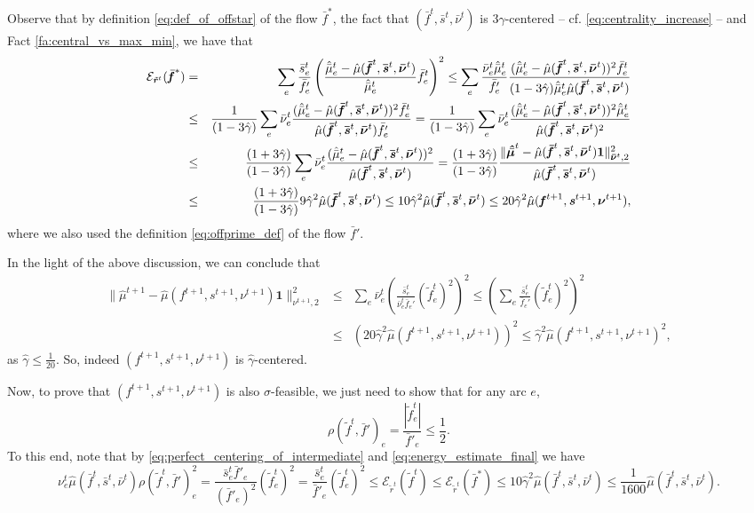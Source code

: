 \documentclass[11pt, letterpaper]{article}
\newcommand{\onev}{\mathbf{1}}
\newcommand{\norm}[2]{\|#1\|_{#2}}
\newcommand{\energy}[2]{\mathcal{E}_{#1}(#2)}
\newcommand{\tf}{\tilde{f}}
\newcommand{\of}{\bar{f}}
\newcommand{\os}{\bar{s}}
\newcommand{\onu}{\bar{\nu}}
\newcommand{\hmu}{\hat{\mu}}
\newcommand{\ohmu}{\hat{\bar{\mu}}}
\newcommand{\hgamma}{\hat{\gamma}}
\newcommand{\vnu}{\boldsymbol{\mathit{\nu}}}
\newcommand{\ovnu}{\boldsymbol{\bar{\mathit{\nu}}}}
\newcommand{\hvmu}{\boldsymbol{\mathit{\hat{\mu}}}}
\newcommand{\ohvmu}{\boldsymbol{\mathit{\hat{\bar{\mu}}}}}
\newcommand{\hvsigma}{\boldsymbol{\mathit{\hat{\sigma}}}}
\newcommand{\ff}{\boldsymbol{\mathit{f}}}
\newcommand{\tff}{\boldsymbol{\mathit{\tilde{f}}}}
\newcommand{\off}{\boldsymbol{\mathit{\bar{f}}}}
\newcommand{\trr}{\boldsymbol{\mathit{\tilde{r}}}}
\renewcommand{\ss}{\boldsymbol{\mathit{s}}}
\newcommand{\oss}{\boldsymbol{\bar{\mathit{s}}}}
\begin{document}
Observe that by definition \eqref{eq:def_of_offstar} of the flow $\off^*$, the fact that $(\off^t,\oss^t,\ovnu^t)$ is $3\hgamma$-centered -- cf. \eqref{eq:centrality_increase} -- and Fact \ref{fa:central_vs_max_min}, we have that
\begin{eqnarray}
\energy{\trr^t}{\off^*} &=& \sum_e \frac{\os_e^t}{\of'_e}\left(\frac{\ohmu_e^t-\hmu(\off^t,\oss^t,\ovnu^t)}{\ohmu_e^t}\of^t_e\right)^2 \leq \sum_e \frac{\onu_e^t\ohmu_e^t}{\of'_e}\frac{(\ohmu_e^t-\hmu(\off^t,\oss^t,\ovnu^t))^2\of_e^t}{(1-3\hgamma)\ohmu_e^t \hmu(\off^t,\oss^t,\ovnu^t)}\notag\\
&\leq & \frac{1}{(1-3\hgamma)}\sum_e \onu_e^t \frac{(\ohmu_e^t-\hmu(\off^t,\oss^t,\ovnu^t))^2\of_e^t}{\hmu(\off^t,\oss^t,\ovnu^t)\of_e'} = \frac{1}{(1-3\hgamma)}\sum_e \onu_e^t \frac{(\ohmu_e^t-\hmu(\off^t,\oss^t,\ovnu^t))^2\ohmu_e^t}{\hmu(\off^t,\oss^t,\ovnu^t)^2}\notag\\
&\leq & \frac{(1+3\hgamma)}{(1-3\hgamma)}\sum_e \onu_e^t \frac{(\ohmu_e^t-\hmu(\off^t,\oss^t,\ovnu^t))^2}{\hmu(\off^t,\oss^t,\ovnu^t)} =  \frac{(1+3\hgamma)}{(1-3\hgamma)} \frac{\norm{\ohvmu^t-\hmu(\off^t,\oss^t,\ovnu^t)\onev}{\ovnu^t,2}^2}{\hmu(\off^t,\oss^t,\ovnu^t)} \label{eq:energy_estimate_final} \\
& \leq  & \frac{(1+3\hgamma)}{(1-3\hgamma)} 9 \hgamma^2 \hmu(\off^t,\oss^t,\ovnu^t) \leq 10 \hgamma^2 \hmu(\off^t,\oss^t,\ovnu^t)\leq 20 \hgamma^2 \hmu(\ff^{t+1},\ss^{t+1},\vnu^{t+1}),\notag
\end{eqnarray}
where we also used the definition \eqref{eq:offprime_def} of the flow $\off'$.


In the light of the above discussion, we can conclude that 
\begin{eqnarray*}
\norm{\hvmu^{t+1}-\hmu(\ff^{t+1},\ss^{t+1},\vnu^{t+1})\onev}{\vnu^{t+1},2}^2 &\leq & \sum_e \onu_e^t \left(\frac{\os_e^t}{\onu^t_e\of_e'} (\tf_e^t)^2\right)^2 \leq \left(\sum_{e} \frac{\os_e^t}{\of_e'} (\tf_e^t)^2\right)^2\\
&\leq &  \left(20 \hgamma^2 \hmu(\ff^{t+1},\ss^{t+1},\vnu^{t+1})\right)^2 \leq \hgamma^2 \hmu(\ff^{t+1},\ss^{t+1},\vnu^{t+1})^2,
\end{eqnarray*}
as $\hgamma\leq \frac{1}{20}$. So, indeed $(\ff^{t+1},\ss^{t+1},\vnu^{t+1})$ is $\hgamma$-centered. 

Now, to prove that $(\ff^{t+1},\ss^{t+1},\vnu^{t+1})$ is also $\hvsigma$-feasible, we just need to show that for any arc $e$, 
\[
\rho(\tff^t,\off')_e=\frac{|\tf^t_e|}{\of'_e}\leq \frac{1}{2}.
\]
To this end, note that by \eqref{eq:perfect_centering_of_intermediate} and \eqref{eq:energy_estimate_final} we have
\begin{equation}
\label{eq:interior_bound_1}
\nu_e^t\hmu(\off^t,\oss^t,\ovnu^t)\rho(\tff^t,\off')_e^2 = \frac{\os_e^t\of'_e}{(\of'_e)^2}(\tf_e^t)^2 = \frac{\os_e^t}{\of'_e}(\tf_e^t)^2\leq \energy{\trr^t}{\tff^t}\leq  \energy{\trr^t}{\off^*} \leq 10 \hgamma^2 \hmu(\off^t,\oss^t,\ovnu^t)\leq \frac{1}{1600} \hmu(\off^t,\oss^t,\ovnu^t).
\end{equation}
\end{document}
